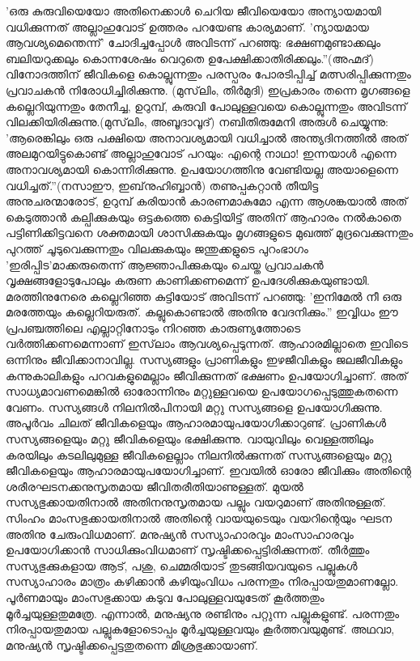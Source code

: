 'ഒരു കുരുവിയെയോ അതിനെക്കാള്‍ ചെറിയ ജീവിയെയോ അന്യായമായി വധിക്കുന്നത് അല്ലാഹുവോട് ഉത്തരം പറയേണ്ട കാര്യമാണ്. 'ന്യായമായ ആവശ്യമെന്തെന്ന്' ചോദിച്ചപ്പോള്‍ അവിടന്ന് പറഞ്ഞു: ഭക്ഷണമുണ്ടാക്കലും ബലിയറുക്കലും കൊന്നശേഷം വെറുതെ ഉപേക്ഷിക്കാതിരിക്കലും.''(അഹ്മദ്)
വിനോദത്തിന് ജീവികളെ കൊല്ലുന്നതും പരസ്പരം പോരടിപ്പിച്ച് മത്സരിപ്പിക്കുന്നതും പ്രവാചകന്‍ നിരോധിച്ചിരിക്കുന്നു. (മുസ്‌ലിം, തിര്‍മുദി)
ഇപ്രകാരം തന്നെ മൃഗങ്ങളെ കല്ലെറിയുന്നതും തേനീച്ച, ഉറുമ്പ്, കുരുവി പോലുള്ളവയെ കൊല്ലുന്നതും അവിടന്ന് വിലക്കിയിരിക്കുന്നു.(മുസ്‌ലിം, അബൂദാവൂദ്)
നബിതിരുമേനി അരുള്‍ ചെയ്യുന്നു: 'ആരെങ്കിലും ഒരു പക്ഷിയെ അനാവശ്യമായി വധിച്ചാല്‍ അന്ത്യദിനത്തില്‍ അത് അലമുറയിട്ടുകൊണ്ട് അല്ലാഹുവോട് പറയും: എന്റെ നാഥാ! ഇന്നയാള്‍ എന്നെ അനാവശ്യമായി കൊന്നിരിക്കുന്നു. ഉപയോഗത്തിനു വേണ്ടിയല്ല അയാളെന്നെ വധിച്ചത്.''(നസാഈ, ഇബ്‌നുഹിബ്ബാന്‍)
തണുപ്പകറ്റാന്‍ തീയിട്ട അനുചരന്മാരോട്, ഉറുമ്പ് കരിയാന്‍ കാരണമാകുമോ എന്ന ആശങ്കയാല്‍ അത് കെടുത്താന്‍ കല്പിക്കുകയും ഒട്ടകത്തെ കെട്ടിയിട്ട് അതിന് ആഹാരം നല്‍കാതെ പട്ടിണിക്കിട്ടവനെ ശക്തമായി ശാസിക്കുകയും മൃഗങ്ങളുടെ മുഖത്ത് മുദ്രവെക്കുന്നതും പുറത്ത് ചൂടുവെക്കുന്നതും വിലക്കുകയും ജന്തുക്കളുടെ പുറംഭാഗം 'ഇരിപ്പിട'മാക്കരുതെന്ന് ആജ്ഞാപിക്കുകയും ചെയ്ത പ്രവാചകന്‍ വൃക്ഷങ്ങളോടുപോലും കരുണ കാണിക്കണമെന്ന് ഉപദേശിക്കുകയുണ്ടായി. മരത്തിനുനേരെ കല്ലെറിഞ്ഞ കുട്ടിയോട് അവിടന്ന് പറഞ്ഞു: 'ഇനിമേല്‍ നീ ഒരു മരത്തേയും കല്ലെറിയരുത്. കല്ലുകൊണ്ടാല്‍ അതിനു വേദനിക്കും.''
ഇവ്വിധം ഈ പ്രപഞ്ചത്തിലെ എല്ലാറ്റിനോടും നിറഞ്ഞ കാരുണ്യത്തോടെ വര്‍ത്തിക്കണമെന്നാണ് ഇസ്‌ലാം ആവശ്യപ്പെടുന്നത്.
ആഹാരമില്ലാതെ ഇവിടെ ഒന്നിനും ജീവിക്കാനാവില്ല. സസ്യങ്ങളും പ്രാണികളും ഇഴജീവികളും ജലജീവികളും കന്നുകാലികളും പറവകളുമെല്ലാം ജീവിക്കുന്നത് ഭക്ഷണം ഉപയോഗിച്ചാണ്. അത് സാധ്യമാവണമെങ്കില്‍ ഓരോന്നിനും മറ്റുള്ളവയെ ഉപയോഗപ്പെടുത്തുകതന്നെ വേണം. സസ്യങ്ങള്‍ നിലനില്‍പിനായി മറ്റു സസ്യങ്ങളെ ഉപയോഗിക്കുന്നു. അപൂര്‍വം ചിലത് ജീവികളെയും ആഹാരമായുപയോഗിക്കാറുണ്ട്. പ്രാണികള്‍ സസ്യങ്ങളെയും മറ്റു ജീവികളെയും ഭക്ഷിക്കുന്നു. വായുവിലും വെള്ളത്തിലും കരയിലും കടലിലുമുള്ള ജീവികളെല്ലാം നിലനില്‍ക്കുന്നത് സസ്യങ്ങളെയും മറ്റു ജീവികളെയും ആഹാരമായുപയോഗിച്ചാണ്. ഇവയില്‍ ഓരോ ജീവിക്കും അതിന്റെ ശരീരഘടനക്കനുസൃതമായ ജീവിതരീതിയാണുള്ളത്. മുയല്‍ സസ്യഭുക്കായതിനാല്‍ അതിനനുസൃതമായ പല്ലും വയറുമാണ് അതിനുള്ളത്. സിംഹം മാംസഭുക്കായതിനാല്‍ അതിന്റെ വായയുടെയും വയറിന്റെയും ഘടന അതിനു ചേരുംവിധമാണ്.
മനുഷ്യന്‍ സസ്യാഹാരവും മാംസാഹാരവും ഉപയോഗിക്കാന്‍ സാധിക്കുംവിധമാണ് സൃഷ്ടിക്കപ്പെട്ടിരിക്കുന്നത്. തീര്‍ത്തും സസ്യഭുക്കുകളായ ആട്, പശു, ചെമ്മരിയാട് തുടങ്ങിയവയുടെ പല്ലുകള്‍ സസ്യാഹാരം മാത്രം കഴിക്കാന്‍ കഴിയുംവിധം പരന്നതും നിരപ്പായതുമാണല്ലോ. പൂര്‍ണമായും മാംസഭുക്കായ കടുവ പോലുള്ളവയുടേത് കൂര്‍ത്തതും മൂര്‍ച്ചയുള്ളതുമത്രേ. എന്നാല്‍, മനുഷ്യനു രണ്ടിനും പറ്റുന്ന പല്ലുകളുണ്ട്. പരന്നതും നിരപ്പായതുമായ പല്ലുകളോടൊപ്പം മൂര്‍ച്ചയുള്ളവയും കൂര്‍ത്തവയുമുണ്ട്. അഥവാ, മനുഷ്യന്‍ സൃഷ്ടിക്കപ്പെട്ടതുതന്നെ മിശ്രഭുക്കായാണ്.
